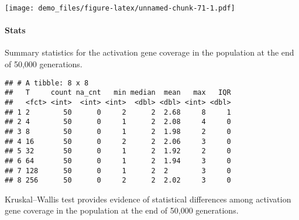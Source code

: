 \documentclass[]{book}
\newenvironment{Shaded}{\begin{snugshade}}{\end{snugshade}}
\newcommand{\DataTypeTok}[1]{\textcolor[rgb]{0.13,0.29,0.53}{#1}}
\newcommand{\KeywordTok}[1]{\textcolor[rgb]{0.13,0.29,0.53}{\textbf{#1}}}
\newcommand{\NormalTok}[1]{#1}
\newcommand{\OperatorTok}[1]{\textcolor[rgb]{0.81,0.36,0.00}{\textbf{#1}}}
\newcommand{\OtherTok}[1]{\textcolor[rgb]{0.56,0.35,0.01}{#1}}
\newcommand{\StringTok}[1]{\textcolor[rgb]{0.31,0.60,0.02}{#1}}
\let\oldparagraph\paragraph
\renewcommand{\paragraph}[1]{\oldparagraph{#1}\mbox{}}
\begin{document}
\texttt{[image: demo\_files/figure-latex/unnamed-chunk-71-1.pdf]}

\hypertarget{stats-36}{%
\paragraph{Stats}\label{stats-36}}

Summary statistics for the activation gene coverage in the population at the end of 50,000 generations.

\begin{Shaded}
\end{Shaded}

\begin{verbatim}
## # A tibble: 8 x 8
##   T     count na_cnt   min median  mean   max   IQR
##   <fct> <int>  <int> <int>  <dbl> <dbl> <int> <dbl>
## 1 2        50      0     2      2  2.68     8     1
## 2 4        50      0     1      2  2.08     4     0
## 3 8        50      0     1      2  1.98     2     0
## 4 16       50      0     2      2  2.06     3     0
## 5 32       50      0     1      2  1.92     2     0
## 6 64       50      0     1      2  1.94     3     0
## 7 128      50      0     1      2  2        3     0
## 8 256      50      0     2      2  2.02     3     0
\end{verbatim}

Kruskal--Wallis test provides evidence of statistical differences among activation gene coverage in the population at the end of 50,000 generations.
\end{document}
